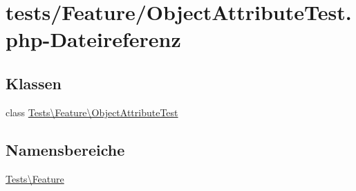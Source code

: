 \hypertarget{ObjectAttributeTest_8php}{}\section{tests/\+Feature/\+Object\+Attribute\+Test.php-\/\+Dateireferenz}
\label{ObjectAttributeTest_8php}
\subsection*{Klassen}
\begin{DoxyCompactItemize}
\item 
class \hyperlink{classTests_1_1Feature_1_1ObjectAttributeTest}{Tests\textbackslash{}\+Feature\textbackslash{}\+Object\+Attribute\+Test}
\end{DoxyCompactItemize}
\subsection*{Namensbereiche}
\begin{DoxyCompactItemize}
\item 
 \hyperlink{namespaceTests_1_1Feature}{Tests\textbackslash{}\+Feature}
\end{DoxyCompactItemize}
